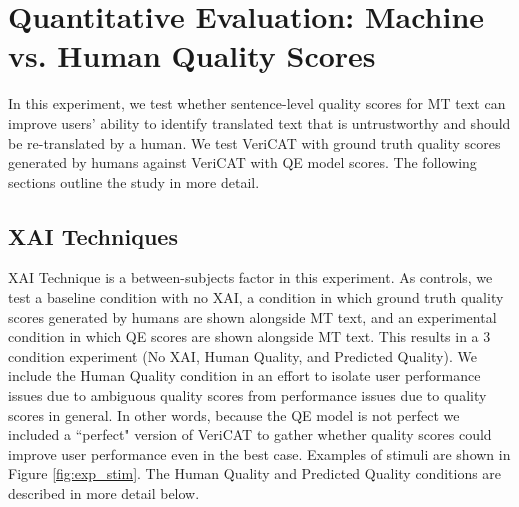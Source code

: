 \section{Quantitative Evaluation: Machine vs. Human Quality Scores} 

In this experiment, we test whether sentence-level quality scores for MT text can improve users' ability to identify translated text that is untrustworthy and should be re-translated by a human. We test VeriCAT with ground truth quality scores generated by humans against VeriCAT with QE model scores. The following sections outline the study in more detail. 

\subsection{XAI Techniques} 

XAI Technique is a between-subjects factor in this experiment. As controls, we test a baseline condition with no XAI, a condition in which ground truth quality scores generated by humans are shown alongside MT text, and an experimental condition in which QE scores are shown alongside MT text. This results in a 3 condition experiment (No XAI, Human Quality, and Predicted Quality). We include the Human Quality condition in an effort to isolate user performance issues due to ambiguous quality scores from performance issues due to quality scores in general. In other words, because the QE model is not perfect we included a ``perfect" version of VeriCAT to gather whether quality scores could improve user performance even in the best case. Examples of stimuli are shown in Figure \ref{fig:exp_stim}. The Human Quality and Predicted Quality conditions are described in more detail below.  
 

